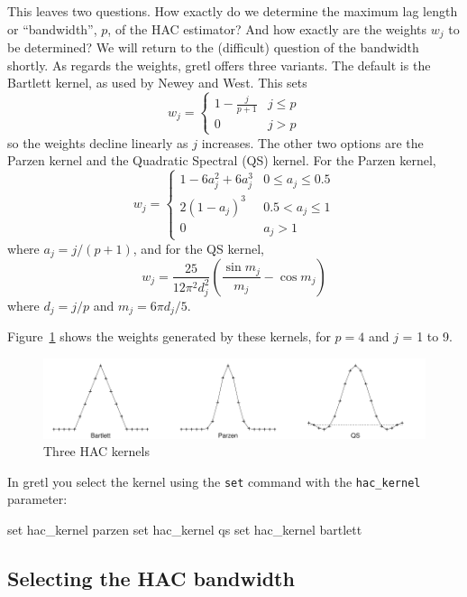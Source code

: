 This leaves two questions.  How exactly do we determine the maximum
lag length or ``bandwidth'', $p$, of the HAC estimator?  And how
exactly are the weights $w_j$ to be determined?  We will return to the
(difficult) question of the bandwidth shortly.  As regards the
weights, gretl offers three variants.  The default is the
Bartlett kernel, as used by Newey and West.  This sets
\[
w_j = \left\{ \begin{array}{cc}
     1 - \frac{j}{p+1} & j \leq p \\
     0 & j > p
     \end{array}
    \right.
\]
so the weights decline linearly as $j$ increases.  The other two
options are the Parzen kernel and the Quadratic Spectral (QS) kernel.
For the Parzen kernel,
\[
w_j = \left\{ \begin{array}{cc}
    1 - 6a_j^2 + 6a_j^3 & 0 \leq a_j \leq 0.5 \\
    2(1 - a_j)^3 & 0.5 < a_j \leq 1 \\
    0 & a_j > 1
    \end{array}
    \right.
\]
where $a_j = j/(p+1)$, and for the QS kernel,
\[
w_j = \frac{25}{12\pi^2 d_j^2} 
   \left(\frac{\sin{m_j}}{m_j} - \cos{m_j} \right)
\]
where $d_j = j/p$ and $m_j = 6\pi d_j/5$.  

Figure~\ref{fig:kernels} shows the weights generated by these kernels,
for $p=4$ and $j$ = 1 to 9.

\begin{figure}[htbp]
\caption{Three HAC kernels}
\label{fig:kernels}
\centering
\includegraphics{figures/kernels}
\end{figure}

In gretl you select the kernel using the \texttt{set} command
with the \verb|hac_kernel| parameter:
%
\begin{code}
set hac_kernel parzen
set hac_kernel qs
set hac_kernel bartlett
\end{code}

\subsection{Selecting the HAC bandwidth}
\label{sec:hac-bw}

